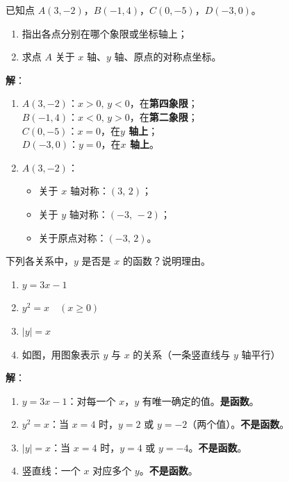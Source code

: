 \documentclass[12pt, a4paper]{ctexart}
\begin{document}
\begin{examplebox}
已知点 $A(3,-2)$，$B(-1,4)$，$C(0,-5)$，$D(-3,0)$。
\begin{enumerate}[label=(\arabic*)]
  \item 指出各点分别在哪个象限或坐标轴上；
  \item 求点 $A$ 关于 $x$ 轴、$y$ 轴、原点的对称点坐标。
\end{enumerate}
\end{examplebox}

\textbf{解}：
\begin{enumerate}[label=(\arabic*)]
  \item $A(3,-2)$：$x>0,\,y<0$，在\textbf{第四象限}；\\
        $B(-1,4)$：$x<0,\,y>0$，在\textbf{第二象限}；\\
        $C(0,-5)$：$x=0$，在\textbf{$y$ 轴上}；\\
        $D(-3,0)$：$y=0$，在\textbf{$x$ 轴上}。
  \item $A(3,-2)$：
        \begin{itemize}
          \item 关于 $x$ 轴对称：$(3,\,2)$；
          \item 关于 $y$ 轴对称：$(-3,\,-2)$；
          \item 关于原点对称：$(-3,\,2)$。
        \end{itemize}
\end{enumerate}

\begin{examplebox}[【例题2】函数概念辨析]
下列各关系中，$y$ 是否是 $x$ 的函数？说明理由。
\begin{enumerate}[label=(\arabic*)]
  \item $y = 3x - 1$
  \item $y^2 = x \quad (x \geqslant 0)$
  \item $|y| = x$
  \item 如图，用图象表示 $y$ 与 $x$ 的关系（一条竖直线与 $y$ 轴平行）
\end{enumerate}
\end{examplebox}

\textbf{解}：
\begin{enumerate}[label=(\arabic*)]
  \item $y = 3x - 1$：对每一个 $x$，$y$ 有唯一确定的值。\textbf{是函数}。
  \item $y^2 = x$：当 $x=4$ 时，$y=2$ 或 $y=-2$（两个值）。\textbf{不是函数}。
  \item $|y| = x$：当 $x=4$ 时，$y=4$ 或 $y=-4$。\textbf{不是函数}。
  \item 竖直线：一个 $x$ 对应多个 $y$。\textbf{不是函数}。
\end{enumerate}
\end{document}
